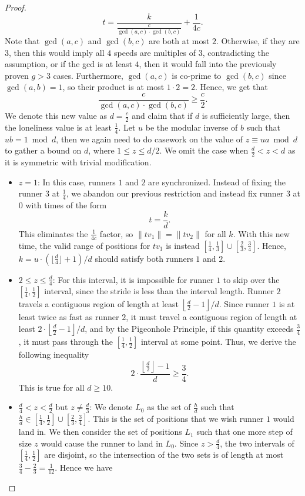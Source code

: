 \documentclass[11pt]{amsart}
\newcommand{\norm}[1]{\lVert #1 \rVert}
\newcommand{\floor}[1]{\lfloor #1 \rfloor}
\newcommand{\Floor}[1]{\left\lfloor #1 \right\rfloor}
\begin{document}
\begin{proof}
    $$t = \frac{k}{\frac{c}{\gcd(a,c) \cdot \gcd(b,c)}} + \frac{1}{4c}.$$
    Note that $\gcd(a,c)$ and $\gcd(b,c)$ are both at most $2$. Otherwise, if they are $3$, then this would imply all $4$ speeds are multiples of $3$, contradicting the assumption, or if the gcd is at least $4$, then it would fall into the previously proven $g > 3$ cases. Furthermore, $\gcd(a,c)$ is co-prime to $\gcd(b,c)$ since $\gcd(a,b) = 1$, so their product is at most $1 \cdot 2 = 2$. Hence, we get that
    $$\frac{c}{\gcd(a,c) \cdot \gcd(b,c)} \geq \frac{c}{2}.$$
    We denote this new value as $d=\frac{c}{2}$ and claim that if $d$ is sufficiently large, then the loneliness value is at least $\frac{1}{4}$. Let $u$ be the modular inverse of $b$ such that $ub = 1 \bmod d$, then we again need to do casework on the value of $z \equiv ua \bmod d$ to gather a bound on $d$, where $1 \leq z \leq d/2$. We omit the case when $\frac{d}{2} < z < d$ as it is symmetric with trivial modification.
    \begin{itemize}
        \item $z = 1$: In this case,  runners $1$ and $2$ are synchronized. Instead of fixing the runner $3$ at $\frac{1}{4}$, we abandon our previous restriction and instead fix runner $3$ at $0$ with times of the form
        $$t = \frac{k}{d}.$$
        This eliminates the $\frac{1}{4c}$ factor, so $\norm{tv_1} = \norm{tv_2}$ for all $k$. With this new time, the valid range of positions for $tv_1$ is instead $[\frac{1}{4},\frac{1}{3}] \cup [\frac{2}{3},\frac{3}{4}]$. Hence, $k = u \cdot \left(\floor{\frac{d}{4}} + 1\right) / d$ should satisfy both runners $1$ and $2$.
        \item $2 \leq z \leq \frac{d}{4}$: For this interval, it is impossible for runner $1$ to skip over the $[\frac{1}{4},\frac{1}{2}]$ interval, since the stride is less than the interval length. Runner $2$ travels a contiguous region of length at least $\Floor{\frac{d}{2} - 1} / d$. Since runner $1$ is at least twice as fast as runner $2$, it must travel a contiguous region of length at least $2 \cdot \Floor{\frac{d}{2} - 1} / d$, and by the Pigeonhole Principle, if this quantity exceeds $\frac{3}{4}$, it must pass through the $[\frac{1}{4},\frac{1}{2}]$ interval at some point. Thus, we derive the following inequality
        $$2 \cdot \frac{\Floor{\frac{d}{2}} - 1}{d} \geq \frac{3}{4}.$$
        This is true for all $d \geq 10$.
        \item $\frac{d}{4} < z < \frac{d}{2}$ but $z \neq \frac{d}{3}$: We denote $L_0$ as the set of $\frac{h}{d}$ such that $\frac{h}{d} \in [\frac{1}{4},\frac{1}{2}] \cup [\frac{2}{3},\frac{3}{4}]$. This is the set of positions that we wish runner $1$ would land in. We then consider the set of positions $L_1$ such that one more step of size $z$ would cause the runner to land in $L_0$. Since $z > \frac{d}{4}$, the two intervals of $[\frac{1}{4}, \frac{1}{2}]$ are disjoint, so the intersection of the two sets is of length at most $\frac{3}{4} - \frac{2}{3} = \frac{1}{12}$. Hence we have 

\end{itemize}
\end{proof}
\end{document}
